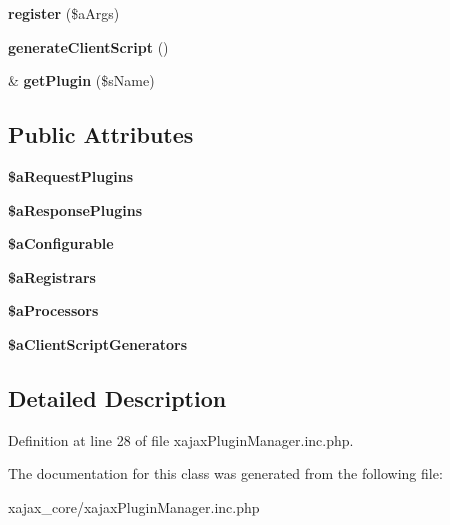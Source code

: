 \begin{DoxyCompactItemize}
\item 
\hypertarget{classxajaxPluginManager_af12e301f77e19d0502f1b5a20a4e055c}{
{\bfseries register} (\$aArgs)}
\label{classxajaxPluginManager_af12e301f77e19d0502f1b5a20a4e055c}

\item 
\hypertarget{classxajaxPluginManager_af714bd63703e3a895bce3de7371fff17}{
{\bfseries generateClientScript} ()}
\label{classxajaxPluginManager_af714bd63703e3a895bce3de7371fff17}

\item 
\hypertarget{classxajaxPluginManager_adda6cd089a467f99b34f0d852fbaad0b}{
\& {\bfseries getPlugin} (\$sName)}
\label{classxajaxPluginManager_adda6cd089a467f99b34f0d852fbaad0b}

\end{DoxyCompactItemize}
\subsection*{Public Attributes}
\begin{DoxyCompactItemize}
\item 
\hypertarget{classxajaxPluginManager_aad9cc084263a9b4ec74631c32e8686e4}{
{\bfseries \$aRequestPlugins}}
\label{classxajaxPluginManager_aad9cc084263a9b4ec74631c32e8686e4}

\item 
\hypertarget{classxajaxPluginManager_a509dbbe90bc7848fceda467656075d87}{
{\bfseries \$aResponsePlugins}}
\label{classxajaxPluginManager_a509dbbe90bc7848fceda467656075d87}

\item 
\hypertarget{classxajaxPluginManager_a5dc29dc140a3033b0b6c4d24503112a6}{
{\bfseries \$aConfigurable}}
\label{classxajaxPluginManager_a5dc29dc140a3033b0b6c4d24503112a6}

\item 
\hypertarget{classxajaxPluginManager_a8d0ea2acee574d166d890df770acb16f}{
{\bfseries \$aRegistrars}}
\label{classxajaxPluginManager_a8d0ea2acee574d166d890df770acb16f}

\item 
\hypertarget{classxajaxPluginManager_a7c07e9acdc95d119f71bb079bb83065d}{
{\bfseries \$aProcessors}}
\label{classxajaxPluginManager_a7c07e9acdc95d119f71bb079bb83065d}

\item 
\hypertarget{classxajaxPluginManager_ade7236d273678d992218351d413e8590}{
{\bfseries \$aClientScriptGenerators}}
\label{classxajaxPluginManager_ade7236d273678d992218351d413e8590}

\end{DoxyCompactItemize}


\subsection{Detailed Description}


Definition at line 28 of file xajaxPluginManager.inc.php.



The documentation for this class was generated from the following file:\begin{DoxyCompactItemize}
\item 
xajax\_\-core/xajaxPluginManager.inc.php\end{DoxyCompactItemize}
